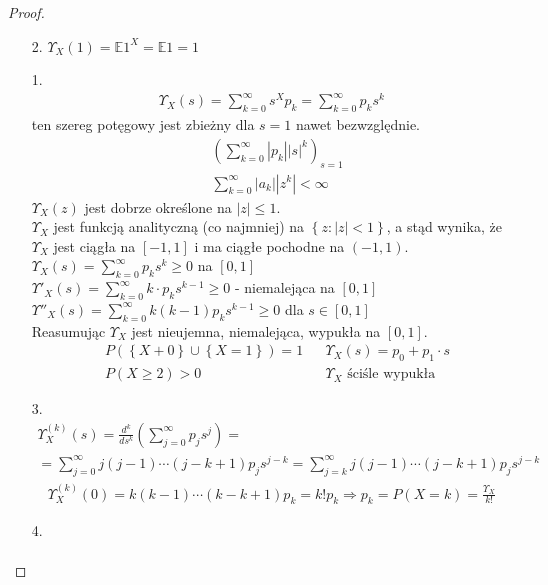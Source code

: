 \begin{proof}\text{ }
\begin{itemize}
\item[2.] $ \Upsilon_X(1)=\mathbb E 1^X=\mathbb E 1=1 $
\item [1.]
\begin{gather*}
\Upsilon_X(s)
=
\sum_{k=0}^{\infty }s^Xp_k
=
\sum_{k=0}^{\infty }p_ks^k
\end{gather*}
ten szereg potęgowy jest zbieżny dla $ s=1 $ nawet bezwzględnie.
\begin{align*}
&\left(\sum_{k=0}^{\infty }\left|p_k\right|\left|s\right|^k \right) _{s=1}\\
&\sum_{k=0}^{\infty }\left|a_k\right|\left|z^k\right|<\infty 
\end{align*}
$ \Upsilon_X(z) $ jest dobrze określone na $ \left|z\right| \le1$.\\
$ \Upsilon_X $ jest funkcją analityczną (co najmniej) na $ \left\{z:\left|z\right|<1\right\} $, a stąd wynika, że $ \Upsilon_X $ jest ciągła na $ [-1,1] $ i ma ciągłe pochodne na $ (-1,1) $.\\
$ \Upsilon_X(s)=\sum_{k=0}^{\infty }p_k s^k\ge0$ na $ [0,1] $\\
$ \Upsilon'_X(s)=\sum_{k=0}^{\infty }k\cdot p_k s^{k-1}\ge0$ - niemalejąca na $ [0,1] $\\
$ \Upsilon''_X(s)=\sum_{k=0}^{\infty }k(k-1) p_k s^{k-1}\ge0 $ dla $ s\in[0,1] $\\
Reasumując $ \Upsilon_X $ jest nieujemna, niemalejąca, wypukła na $ [0,1] $.\\
\begin{align*}
&P\left(\left\{X+0\right\}\cup\left\{X=1\right\}\right)=1
&&\Upsilon_X(s)=p_0+p_1\cdot s\\
&P\left(X\ge2 \right)>0
&&\Upsilon_X \text{ ściśle wypukła}
\end{align*}
\item [3.]
\begin{gather*}
\Upsilon_X^{(k)}(s)=\frac{d^k}{ds^k}\left(\sum_{j=0}^{\infty }p_js^j\right)
=\\=
\sum_{j=0}^{\infty }j(j-1)\cdots(j-k+1)p_js^{j-k}
=
\sum_{j=k}^{\infty }j(j-1)\cdots(j-k+1)p_js^{j-k}
\end{gather*}
\begin{gather*}
\Upsilon_X^{(k)}(0)=k(k-1)\cdots(k-k+1)p_k=k!p_k\Rightarrow p_k=P\left(X=k\right)=\frac{\Upsilon_X}{k!}
\end{gather*}
\item [4.]
\begin{align*}

\end{align*}
\end{itemize}
\end{proof}
